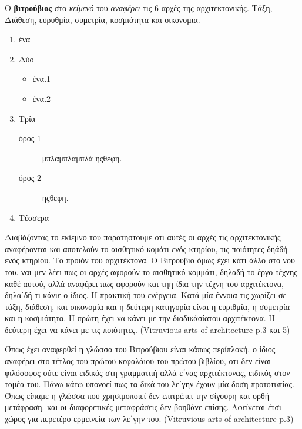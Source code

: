   
  Ο {\color{red}\textbf{βιτρούβιος}} στο \emph{κείμενό} του \textit{αναφέρει} τις 6 αρχές της αρχιτεκτονικής. Τάξη, Διάθεση, ευρυθμία, συμετρία, κοσμιότητα και οικονομια. \cite{scranton_vitruvius_1974, vitruvius-lefas}
  
\begin{enumerate}[noitemsep] %
  \item ένα
  \item Δύο
  
  \begin{itemize}
    \item ένα.1
    \item ένα.2
  \end{itemize}
  
  \item Τρία
  
    \begin{description}
      \item[όρος 1] μπλαμπλαμπλά ηςθεφη.
      \item[όρος 2] ηςθεφη.
    \end{description}
  
  \item Τέσσερα
\end{enumerate}

Διαβάζοντας το εκίεμνο του παρατηστουμε οτι αυτές οι αρχές τις αρχιτεκτονικής αναφέρονται και αποτελούν το αισθητικό κομάτι ενός κτηρίου, τις ποιότητες δηάδή ενός κτηρίου. Το προιόν του αρχιτέκτονα. Ο Βιτρούβιο όμως έχει κάτι άλλο στο νου του. ναι μεν λέει πως οι αρχές αφορούν το αισθητικό κομμάτι, δηλαδή το έργο τέχνης καθέ αυτού, αλλά αναφέρει πως αφορούν και τηη ίδια την τέχνη του αρχιτέκτονα, δηλα΄δή τι κάνιε ο ίδιος. Η πρακτική του ενέργεια. Κατά μία έννοια τις χωρίζει σε τάξη, διάθεση, και οικονομία και η δεύτερη κατηγορία είναι η ευριθμία, η συμετρία και η κοσμιότητα. Η πρώτη έχει να κάνει με την διαδικάσίατου αρχιτέκτονα. Η δεύτερη έχει να κάνει με τις ποιότητες. (Vitruvious arts of architecture p.3 και 5)
  
  Όπως έχει αναφερθεί η γλώσσα του Βιτρούβιου είναι κάπως περίπλοκή. ο ίδιος   αναφέρει στο τέτλος του πρώτου κεφαλάιου του πρώτου βιβλίου, οτι δεν είναι   φιλόσοφος ούτε είναι ειδικός στη γραμματιιή αλλά ε΄νας αρχιτέκτονας, ειδικός   στον τομέα του. Πάνω κάτω υπονοεί πως τα δικά του λε΄γην έχουν μία δοση   προτοτυπίας. Όπως είπαμε η γλώσσα που χρησιμοποιεί δεν επιτρέπει την σίγουρη   και ορθή μετάφραση. και οι διαφορετικές μεταφράσεις δεν βοηθάνε επίσης.   Αφείνεται έτσι χώρος για περετέρο ερμεινεία των λε΄γην του. (Vitruvious arts   of architecture p.3)
  
